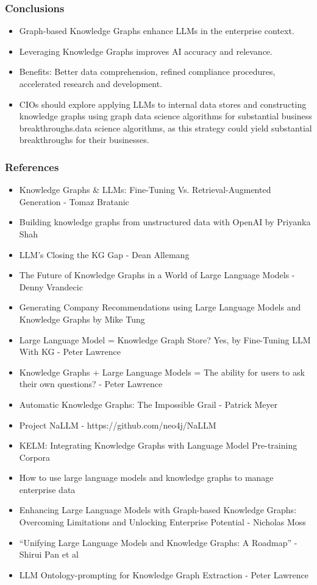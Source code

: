 \begin{frame}[fragile]\frametitle{Conclusions}
\begin{itemize}
\item Graph-based Knowledge Graphs enhance LLMs in the enterprise context.
\item Leveraging Knowledge Graphs improves AI accuracy and relevance.
\item Benefits: Better data comprehension, refined compliance procedures, accelerated research and development.
\item CIOs should explore applying LLMs to internal data stores and constructing knowledge graphs using graph data science algorithms for substantial business breakthroughs.data science algorithms, as this strategy could yield substantial breakthroughs for their businesses.
\end{itemize}
\end{frame}


\begin{frame}[fragile]\frametitle{References}
\begin{itemize}
\item Knowledge Graphs \& LLMs: Fine-Tuning Vs. Retrieval-Augmented Generation - Tomaz Bratanic
\item Building knowledge graphs from unstructured data with OpenAI by Priyanka Shah
\item LLM’s Closing the KG Gap - Dean Allemang
\item The Future of Knowledge Graphs in a World of Large Language Models - Denny Vrandecic
\item Generating Company Recommendations using Large Language Models and Knowledge Graphs by Mike Tung
\item Large Language Model = Knowledge Graph Store? Yes, by Fine-Tuning LLM With KG - Peter Lawrence
\item Knowledge Graphs + Large Language Models = The ability for users to ask their own questions? - Peter Lawrence
\item Automatic Knowledge Graphs: The Impossible Grail - Patrick Meyer
\item Project NaLLM - https://github.com/neo4j/NaLLM
\item KELM: Integrating Knowledge Graphs with Language Model Pre-training Corpora 
\item How to use large language models and knowledge graphs to manage enterprise data 
\item Enhancing Large Language Models with Graph-based Knowledge Graphs: Overcoming Limitations and Unlocking Enterprise Potential - Nicholas Moss
\item ``Unifying Large Language Models and Knowledge Graphs: A Roadmap'' - Shirui Pan et al
\item LLM Ontology-prompting for Knowledge Graph Extraction - Peter Lawrence
\end{itemize}
\end{frame}

